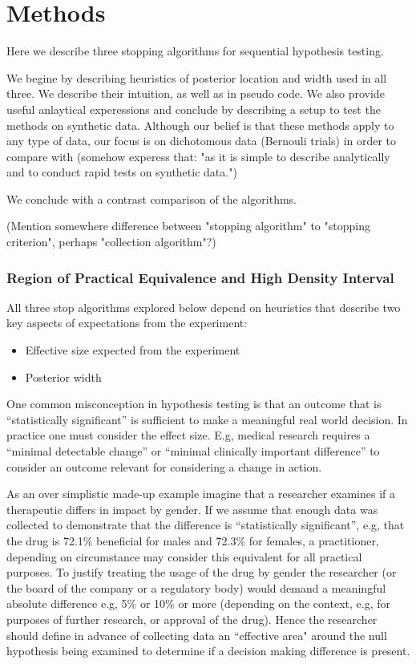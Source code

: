 \documentclass{article}
\begin{document}
\section{Methods}

Here we describe three stopping algorithms for sequential hypothesis testing.

We begine by describing heuristics of posterior location and width used in all three.
We describe their intuition, as well as in pseudo code.
We also provide useful anlaytical experessions and conclude by describing a setup
to test the methods on synthetic data.
Although our belief is that these methods apply to any type of data,
our focus is on dichotomous data (Bernouli trials)
in order to compare with \cite{kruschke2015doing}
(somehow experess that: "as it is simple to describe analytically and
to conduct rapid tests on synthetic data.")

We conclude with a contrast comparison of the algorithms.

(Mention somewhere difference between "stopping algorithm" to "stopping criterion",
perhaps "collection algorithm"?)


\subsubsection{Region of Practical Equivalence and High Density Interval}
All three stop algorithms explored below depend on heuristics that describe two key
aspects of expectations from the experiment:
\begin{itemize}
    \item Effective size expected from the experiment
    \item Posterior width
\end{itemize}


One common misconception in hypothesis testing is that an outcome that is
“statistically significant” is sufficient to make a meaningful real world decision.
In practice one must consider the effect size.
E.g, medical research requires a “minimal detectable change” or
“minimal clinically important difference” to consider an outcome relevant for
considering a change in action.

As an over simplistic made-up example imagine that a researcher examines if a
therapeutic differs in impact by gender.
If we assume that enough data was collected to demonstrate that the difference is
“statistically significant”, e.g, that the drug is 72.1\% beneficial for males
and 72.3\% for females, a practitioner, depending on circumstance may consider
this equivalent for all practical purposes.
To justify treating the usage of the drug by gender the
researcher (or the board of the company or a regulatory body) would demand
a meaningful absolute difference e.g,  5\% or 10\% or more
(depending on the context, e.g, for purposes of further research, or approval
of the drug). Hence the researcher should define in advance of collecting data an
“effective area" around the null hypothesis being examined to determine if a
decision making difference is present.
\end{document}

